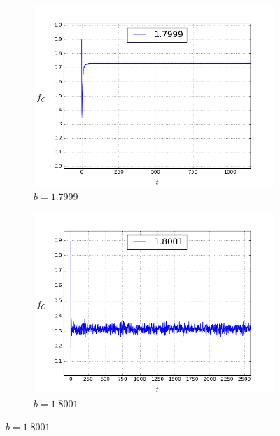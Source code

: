 \documentclass[12pt,a4paper]{article}
\begin{document}
	
	\begin{figure}[H]
		\centering
		\begin{subfigure}{.5\textwidth}
			\includegraphics[width=1\linewidth]{f1.7999.png}
			\caption{$b=1.7999$}
			\label{freq_left}
		\end{subfigure}%
		\begin{subfigure}{.5\textwidth}
			\includegraphics[width=1\linewidth]{f1.8001.png}
			\caption{$b=1.8001$}
			\label{freq_right}
		\end{subfigure}%
		

\end{figure}
\end{document}
